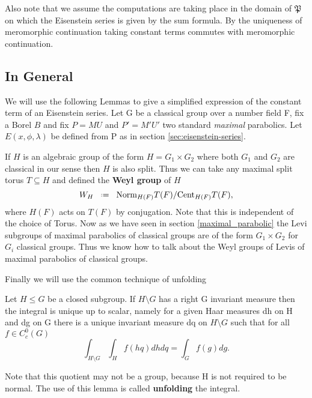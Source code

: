 Also note that we assume the computations are taking place in the domain of \(\mathfrak{P}\) on which the Eisenstein series is given by the sum formula. By the uniqueness of meromorphic continuation taking constant terms commutes with meromorphic continuation.

\subsection{In General}
We will use the following Lemmas to give a simplified expression of the constant term of an Eisenstein series. Let G be a classical group over a number field F, fix a Borel \(B\) and fix \(P = MU\) and \(P' = M'U'\) two standard \textit{maximal} parabolics. Let \(E(x, \phi, \lambda)\) be defined from P as in section \ref{sec:eisenstein-series}.


If \(H\) is an algebraic group of the form \(H= G_1\times G_2\) where both \(G_1\) and \(G_2\) are classical in our sense then \(H\) is also split. Thus we can take any maximal split torus \(T\subseteq H\) and defined the \textbf{Weyl group} of \(H\)
\[W_H\defeq \mathrm{Norm}_{H(F)} T(F) /\mathrm{Cent}_{H(F)}T(F),\] 
where \(H(F)\) acts on \(T(F)\) by conjugation. Note that this is independent of the choice of Torus. Now as we have seen in section \ref{maximal_parabolic} the Levi subgroups of maximal parabolics of classical groups are of the form \(G_1\times G_2\) for \(G_i\) classical groups. Thus we know how to talk about the Weyl groups of Levis of maximal parabolics of classical groups.

Finally we will use the common technique of unfolding
\begin{Theorem}
	Let \(H\leq G\) be a closed subgroup. If \(H\setminus G\) has a right G invariant measure then the integral is unique up to scalar, namely for a given Haar measures dh on H and dg on G there is a unique invariant measure dq on \(H\setminus G\) such that for all \(f\in C_c^0(G)\)
	\[\int_{H\setminus G}\int_H f(hq)dhdq = \int_G f(g) dg.\]
\end{Theorem}
Note that this quotient may not be a group, because H is not required to be normal. The use of this lemma is called \textbf{unfolding} the integral.

